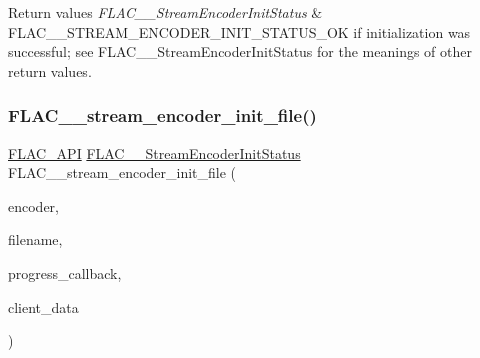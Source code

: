\begin{DoxyRetVals}{Return values}
{\em F\+L\+A\+C\+\_\+\+\_\+\+Stream\+Encoder\+Init\+Status} & {\ttfamily F\+L\+A\+C\+\_\+\+\_\+\+S\+T\+R\+E\+A\+M\+\_\+\+E\+N\+C\+O\+D\+E\+R\+\_\+\+I\+N\+I\+T\+\_\+\+S\+T\+A\+T\+U\+S\+\_\+\+OK} if initialization was successful; see F\+L\+A\+C\+\_\+\+\_\+\+Stream\+Encoder\+Init\+Status for the meanings of other return values. \\
\hline
\end{DoxyRetVals}
\mbox{\label{group__flac__stream__encoder_ga693bb5ed30d912822e0e6c7c0404428c}} 
\subsubsection{\texorpdfstring{F\+L\+A\+C\+\_\+\+\_\+stream\+\_\+encoder\+\_\+init\+\_\+file()}{FLAC\_\_stream\_encoder\_init\_file()}}
{\footnotesize\ttfamily \hyperlink{group__flac__export_ga56ca07df8a23310707732b1c0007d6f5}{F\+L\+A\+C\+\_\+\+A\+PI} \hyperlink{group__flac__stream__encoder_ga3bb869620af2b188d77982a5c30b047d}{F\+L\+A\+C\+\_\+\+\_\+\+Stream\+Encoder\+Init\+Status} F\+L\+A\+C\+\_\+\+\_\+stream\+\_\+encoder\+\_\+init\+\_\+file (\begin{DoxyParamCaption}\item[{\hyperlink{struct_f_l_a_c_____stream_encoder}{F\+L\+A\+C\+\_\+\+\_\+\+Stream\+Encoder} $\ast$}]{encoder,  }\item[{\hyperlink{zconf_8h_a2c212835823e3c54a8ab6d95c652660e}{const} char $\ast$}]{filename,  }\item[{\hyperlink{group__flac__stream__encoder_ga6e051c0e5837433f9e7cd56cd42ca6ba}{F\+L\+A\+C\+\_\+\+\_\+\+Stream\+Encoder\+Progress\+Callback}}]{progress\+\_\+callback,  }\item[{\hyperlink{png_8h_ac9c84fa68bbad002983e35ce3663c686}{void} $\ast$}]{client\+\_\+data }\end{DoxyParamCaption})}

